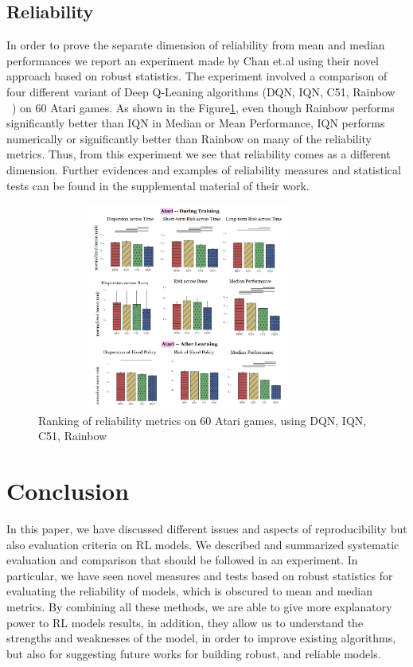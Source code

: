 \documentclass{article}
\begin{document}
\subsection{Reliability}
In order to prove the separate dimension of reliability from mean and median performances we report an experiment made by Chan et.al using their novel approach based on robust statistics. The experiment involved a comparison of four different variant of Deep Q-Leaning algorithms (DQN, IQN, C51, Rainbow ~\cite{DQN, IQN, C51,Rainbow}) on 60 Atari games. As shown in the Figure\ref{fig:realibility}, even though Rainbow performs significantly better than IQN in Median or Mean Performance, IQN performs numerically or significantly better than Rainbow on many of the reliability metrics. Thus, from this experiment we see that reliability comes as a different dimension. Further evidences and examples of reliability measures and statistical tests can be found in the supplemental material of their work.
\begin{figure}[!htp]
	\centering
	\includegraphics[width=10cm, height=6.8cm]{./images/atari_ranking.png}
	\caption{Ranking of reliability metrics on 60 Atari games, using DQN, IQN, C51, Rainbow~\cite{GoogleMeasure}}
	\label{fig:realibility}
	\footnotesize{}
\end{figure}
\section{Conclusion}
In this paper, we have discussed different issues and aspects of reproducibility but also evaluation criteria on RL models. We described and summarized systematic evaluation and comparison that should be followed in an experiment. In particular, we have seen novel measures and tests based on robust statistics for evaluating the reliability of models, which is obscured to mean and median metrics. By combining all these methods, we are able to give more explanatory power to RL models results, in addition, they allow us to understand the strengths and weaknesses of the model, in order to improve existing algorithms, but also for suggesting future works for building robust, and reliable models.

{\small
	
	
}

\appendix
\end{document}
